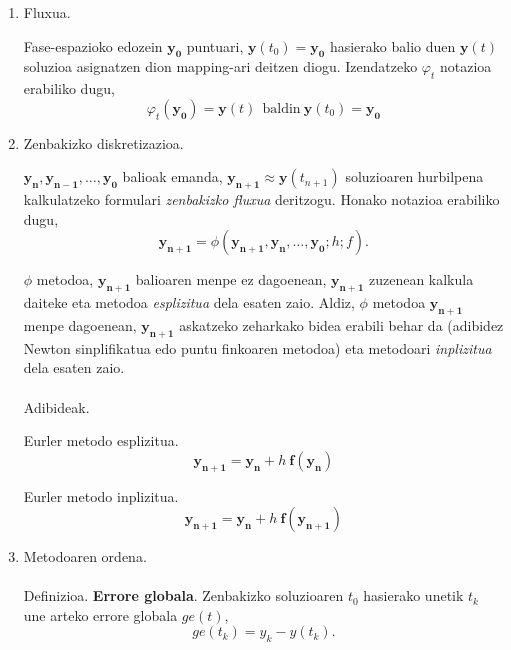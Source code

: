 \begin{enumerate}

\item Fluxua.

Fase-espazioko edozein $\mathbf{y_0}$ puntuari, $\mathbf{y}(t_0)=\mathbf{y_0}$ hasierako balio duen $\mathbf{y}(t)$ soluzioa asignatzen dion mapping-ari deitzen diogu. Izendatzeko $\varphi_t$ notazioa erabiliko dugu,
\begin{equation*}
\varphi_t(\mathbf{y_0})=\mathbf{y}(t) \ \ \text{baldin} \  \mathbf{y}(t_0)=\mathbf{y_0}
\end{equation*}

\item Zenbakizko diskretizazioa.

$\mathbf{y_{n}},\mathbf{y_{n-1}},\dots ,\mathbf{y_0}$ balioak emanda, $\mathbf{y_{n+1}}\approx \mathbf{y}(t_{n+1})$ soluzioaren hurbilpena kalkulatzeko formulari \emph{zenbakizko fluxua} deritzogu. Honako notazioa erabiliko dugu,
\begin{equation*}
\mathbf{y_{n+1}}=\phi(\mathbf{y_{n+1}},\mathbf{y_{n}},\dots,\mathbf{y_0};h;f).
\end{equation*}

$\phi$ metodoa, $\mathbf{y_{n+1}}$ balioaren menpe ez dagoenean, $\mathbf{y_{n+1}}$ zuzenean kalkula daiteke eta metodoa \emph{esplizitua} dela esaten zaio. Aldiz, $\phi$ metodoa $\mathbf{y_{n+1}}$ menpe dagoenean, $\mathbf{y_{n+1}}$ askatzeko zeharkako bidea erabili behar da (adibidez Newton sinplifikatua edo puntu finkoaren metodoa) eta metodoari \emph{inplizitua} dela esaten zaio.  

\paragraph*{} Adibideak.

Eurler metodo esplizitua.
\begin{equation*}
\label{eq41}
\mathbf{y_{n+1}}=\mathbf{y_n}+h  \ \mathbf{f}(\mathbf{y_n}) 
\end{equation*} 

Eurler metodo inplizitua.
\begin{equation*}
\label{eq41}
\mathbf{y_{n+1}}=\mathbf{y_n}+h  \ \mathbf{f}(\mathbf{y_{n+1}}) 
\end{equation*} 

\item Metodoaren ordena.

\paragraph*{}Definizioa. \textbf{Errore globala}. Zenbakizko soluzioaren $t_0$ hasierako unetik $t_k$ une arteko errore globala $ge(t)$,
\begin{equation*}
ge(t_k)=y_k-y(t_k).
\end{equation*}
  

\end{enumerate}
